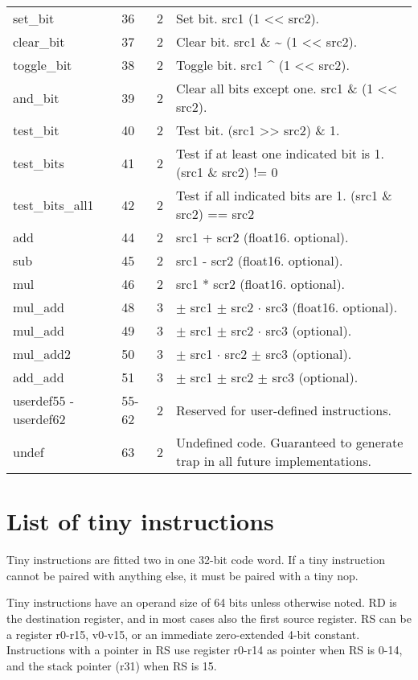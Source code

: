 \documentclass[forwardcom.tex]{subfiles}
\begin{document}
\begin{longtable} {|p{25mm}|p{12mm}|p{12mm}|p{100mm}|}
set\_bit     & 36 & 2 & Set bit. src1 \textbar{} (1 \textless\textless{} src2). \\
clear\_bit   & 37 & 2 & Clear bit. src1 \& \~{} (1 \textless\textless{} src2). \\
toggle\_bit  & 38 & 2 & Toggle bit. src1 \^{} (1 \textless\textless{} src2). \\
and\_bit     & 39 & 2 & Clear all bits except one. src1 \&{} (1 \textless\textless{} src2). \\
test\_bit    & 40 & 2 & Test bit. (src1 \textgreater\textgreater{} src2) \& 1. \\
test\_bits   & 41 & 2 & Test if at least one indicated bit is 1. (src1 \& src2) != 0 \\
test\_bits\_all1 & 42 & 2 & Test if all indicated bits are 1. (src1 \& src2) == src2 \\
add          & 44 & 2 & src1 + scr2 (float16. optional). \\
sub          & 45 & 2 & src1 - scr2 (float16. optional). \\
mul          & 46 & 2 & src1 * scr2 (float16. optional). \\
mul\_add     & 48 & 3 & $\pm$ src1 $\pm$ src2 $\cdot$ src3 (float16. optional). \\
mul\_add     & 49 & 3 & $\pm$ src1 $\pm$ src2 $\cdot$ src3 (optional). \\
mul\_add2    & 50 & 3 & $\pm$ src1 $\cdot$ src2 $\pm$ src3 (optional). \\
add\_add     & 51 & 3 & $\pm$ src1 $\pm$ src2 $\pm$ src3 (optional). \\
userdef55 - userdef62
             & 55-62 & 2 & Reserved for user-defined instructions. \\
undef        & 63 & 2 & Undefined code. Guaranteed to generate trap in all future implementations. \\
\hline
\end{longtable}


\section{List of tiny instructions}
Tiny instructions are fitted two in one 32-bit code word. If a tiny instruction cannot be paired with anything else, it must be paired with a tiny nop.
\vspace{2mm}

Tiny instructions have an operand size of 64 bits unless otherwise noted. RD is the destination register, and in most cases also the first source register. RS can be a register r0-r15, v0-v15, or an immediate zero-extended 4-bit constant. Instructions with a pointer in RS use register r0-r14 as pointer when RS is 0-14, and the stack pointer (r31) when RS is 15.
\vspace{2mm}
\end{document}
